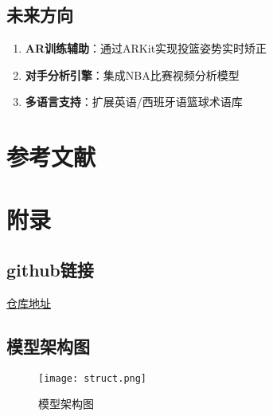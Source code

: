 \documentclass{article}
\theoremstyle{plain}
\theoremstyle{definition}
\theoremstyle{remark}
\begin{document}
\subsection{未来方向}
\begin{enumerate}
    \item \textbf{AR训练辅助}：通过ARKit实现投篮姿势实时矫正
    \item \textbf{对手分析引擎}：集成NBA比赛视频分析模型
    \item \textbf{多语言支持}：扩展英语/西班牙语篮球术语库
\end{enumerate}

\section{参考文献}




\newpage
\appendix
\onecolumn
\section{附录}
\subsection{github链接}
\href{https://github.com/LHS183019/AIBasicFinalProject.git}{仓库地址}
\subsection{模型架构图}
\begin{figure}[htbp]
    \centering %
    \texttt{[image: struct.png]} %
    \caption{模型架构图} %
\end{figure}
\end{document}
